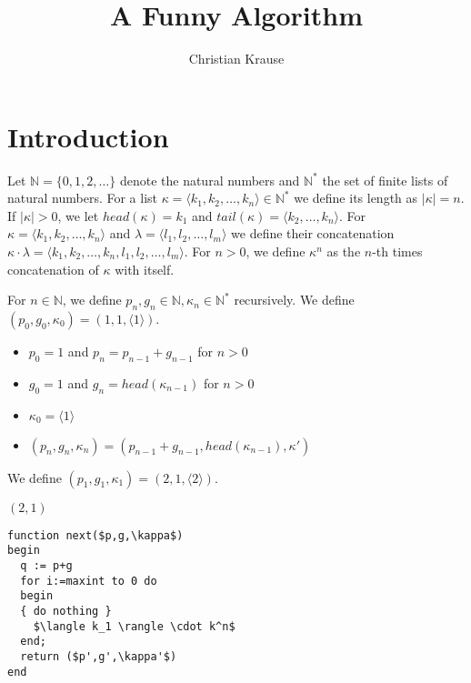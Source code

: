 \documentclass[a4paper,11pt]{article}
\title{A Funny Algorithm}
\author{Christian Krause}
\begin{document}
\maketitle


\section{Introduction}

Let $\mathbb{N} =\{ 0,1,2,\ldots \}$ denote the natural numbers
and $\mathbb{N}^*$ the set of finite lists of natural numbers.
For a list $\kappa = \langle k_1,k_2,\ldots,k_n \rangle \in \mathbb{N}^*$ 
we define its length as $|\kappa| = n$. If $|\kappa| > 0$, we let 
$head(\kappa) = k_1$ and $tail(\kappa) = \langle k_2,\ldots,k_n \rangle$.
For $\kappa = \langle k_1,k_2,\ldots,k_n \rangle$ and $\lambda = \langle l_1,l_2,\ldots,l_m \rangle$
we define their concatenation $\kappa \cdot \lambda = \langle k_1,k_2,\ldots,k_n,l_1,l_2,\ldots, l_m \rangle$.
For $n>0$, we define $\kappa^n$ as the $n$-th times concatenation of $\kappa$
with itself.

For $n\in \mathbb{N}$, we define $p_n,g_n \in \mathbb{N}, \kappa_n\in \mathbb{N}^*$ recursively.
We define $(p_0,g_0,\kappa_0)=(1,1,\langle 1 \rangle)$.
\begin{itemize}
\item $p_0 = 1$ and $p_n = p_{n-1}+g_{n-1}$ for $n>0$
\item $g_0 = 1$ and $g_n = head(\kappa_{n-1})$ for $n>0$
\item $\kappa_0=\langle 1 \rangle$
\item $(p_n,g_n,\kappa_n) = (p_{n-1}+g_{n-1},head(\kappa_{n-1}),\kappa')$
\end{itemize}



We define $(p_1,g_1,\kappa_1) = (2,1,\langle 2 \rangle)$.

$(2,1)$

\begin{lstlisting}[frame=single,mathescape=true]
function next($p,g,\kappa$)
begin
  q := p+g
  for i:=maxint to 0 do
  begin
  { do nothing }
    $\langle k_1 \rangle \cdot k^n$
  end;
  return ($p',g',\kappa'$)
end
\end{lstlisting}
\end{document}
